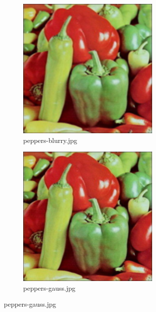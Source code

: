 \begin{figure}[H]
    \centering
    \begin{subfigure}{0.25\textwidth}
        \caption{peppers-blurry.jpg}
        \includegraphics[width=\textwidth]{figures/peppers-blurry.jpg}
    \end{subfigure}
    \begin{subfigure}{0.25\textwidth}
        \caption{peppers-gauss.jpg}
        \includegraphics[width=\textwidth]{figures/peppers-gauss.jpg}

\end{subfigure}
\end{figure}
